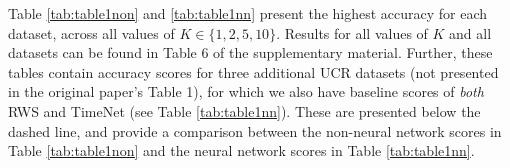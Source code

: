 Table \ref{tab:table1non} and \ref{tab:table1nn} present the highest accuracy  for each dataset, across all values of $K \in \{1,2,5,10\}$. Results for all values of $K$ and all datasets can be found in Table 6 of the supplementary material.
Further, these tables contain accuracy scores for three additional UCR datasets (not presented in the original paper's Table 1), for which we also have baseline scores of \textit{both} RWS and TimeNet (see Table \ref{tab:table1nn}). These are presented below the dashed line, and provide a comparison between the non-neural network scores in Table \ref{tab:table1non} and the neural network scores in Table \ref{tab:table1nn}.


